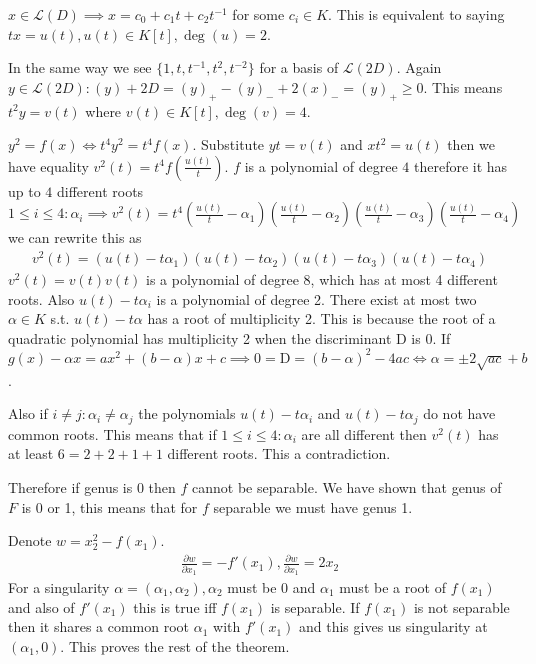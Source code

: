 \documentclass[12pt, a4paper]{article}
\begin{document}
$x \in \mathcal{L}(D) \implies x = c_0+c_1t+c_2t^{-1}$ for some $c_i \in K$. This is equivalent to saying $tx = u(t), u(t) \in K[t], \deg(u)=2$.

In the same way we see $\{1,t,t^{-1},t^2,t^{-2}\}$ for a basis of $\mathcal{L}(2D)$. Again $y \in \mathcal{L}(2D): (y) + 2D = (y)_{+} - (y)_{-} + 2(x)_{-} = (y)_{+} \geq 0$. This means $t^2y = v(t)$ where $v(t) \in K[t], \deg(v)=4$.

$y^2 = f(x) \iff t^4y^2=t^4f(x)$. Substitute $yt=v(t)$ and $xt^2=u(t)$ then we have equality $v^2(t)=t^4f(\frac{u(t)}{t})$. $f$ is a polynomial of degree $4$ therefore it has up to $4$ different roots $1 \leq i \leq 4: \alpha_i \implies v^2(t)=t^4(\frac{u(t)}{t}-\alpha_1)(\frac{u(t)}{t}-\alpha_2)(\frac{u(t)}{t}-\alpha_3)(\frac{u(t)}{t}-\alpha_4)$ we can rewrite this as 
\begin{gather*}
v^2(t)=(u(t)-t\alpha_1)(u(t)-t\alpha_2)(u(t)-t\alpha_3)(u(t)-t\alpha_4)
\end{gather*}
$v^2(t)=v(t)v(t)$ is a polynomial of degree $8$, which has at most 4 different roots. Also $u(t)-t\alpha_i$ is a polynomial of degree 2. There exist at most two $\alpha \in K$ s.t. $u(t)-t\alpha$ has a root of multiplicity 2. This is because the root of a quadratic polynomial has multiplicity 2 when the discriminant D is 0. If $g(x)-\alpha x=ax^2+(b-\alpha)x+c \implies 0 = \text{D} = (b-\alpha)^2-4ac \iff \alpha = \pm 2\sqrt{ac}+b$.

Also if $i\neq j: \alpha_i \neq \alpha_j$ the polynomials $u(t)-t\alpha_i$ and $u(t)-t\alpha_j$ do not have common roots. This means that if $1 \leq i \leq 4: \alpha_i$ are all different then $v^2(t)$ has at least $6 = 2+2+1+1$ different roots. This a contradiction.

Therefore if genus is $0$ then $f$ cannot be separable. We have shown that genus of $F$ is 0 or 1, this means that for $f$ separable we must have genus 1.

Denote $w=x_2^2-f(x_1)$.
\begin{gather}
\frac{\partial w}{\partial x_1} = -f'(x_1), \frac{\partial w}{\partial x_1} = 2x_2
\end{gather}
For a singularity $\alpha = (\alpha_1, \alpha_2), \alpha_2$ must be $0$ and $\alpha_1$ must be a root of $f(x_1)$ and also of $f'(x_1)$ this is true iff $f(x_1)$ is separable. If $f(x_1)$ is not separable then it shares a common root $\alpha_1$ with $f'(x_1)$ and this gives us singularity at $(\alpha_1, 0)$. This proves the rest of the theorem.
\end{document}
